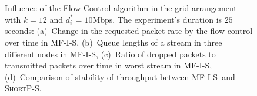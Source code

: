 \documentclass[12pt,oneside,english,a4paper]{book}
\theoremstyle{plain}
\theoremstyle{definition}
\theoremstyle{Theorem}
\theoremstyle{plain}
\newenvironment{proof sketch}[1]{\noindent {\emph{Proof sketch of #1:}}}{\hfill \qed}
\newcommand{\algA}{\textsc{MF-I-S}}
\newcommand{\algBS}{\textsc{ShortP-S}}
\begin{document}
\begin{figure}%
      \centering
        \\
        \\
        \caption{Influence of the Flow-Control algorithm in  the grid arrangement with $k=12$ and $d^*_i=10$Mbps. The experiment's duration is $25$ seconds: (a)~Change in the requested packet rate by the flow-control over time in \algA , (b)~Queue lengths of a stream in three different nodes in \algA , (c)~Ratio of dropped packets to transmitted packets over time in worst stream in \algA , (d)~Comparison of stability of throughput between \algA\ and \algBS.
        }
    \label{fig:fcbig}
     \end{figure}
\end{document}
